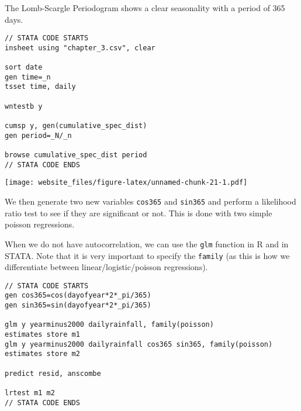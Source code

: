 \documentclass[]{book}
\newenvironment{Shaded}{\begin{snugshade}}{\end{snugshade}}
\newcommand{\KeywordTok}[1]{\textcolor[rgb]{0.13,0.29,0.53}{\textbf{#1}}}
\newcommand{\DataTypeTok}[1]{\textcolor[rgb]{0.13,0.29,0.53}{#1}}
\newcommand{\DecValTok}[1]{\textcolor[rgb]{0.00,0.00,0.81}{#1}}
\newcommand{\StringTok}[1]{\textcolor[rgb]{0.31,0.60,0.02}{#1}}
\newcommand{\CommentTok}[1]{\textcolor[rgb]{0.56,0.35,0.01}{\textit{#1}}}
\newcommand{\OperatorTok}[1]{\textcolor[rgb]{0.81,0.36,0.00}{\textbf{#1}}}
\newcommand{\NormalTok}[1]{#1}
\begin{document}
\newpage

The Lomb-Scargle Periodogram shows a clear seasonality with a period of
365 days.

\begin{verbatim}
// STATA CODE STARTS
insheet using "chapter_3.csv", clear

sort date
gen time=_n
tsset time, daily

wntestb y

cumsp y, gen(cumulative_spec_dist)
gen period=_N/_n

browse cumulative_spec_dist period
// STATA CODE ENDS
\end{verbatim}

\begin{Shaded}
\end{Shaded}

\texttt{[image: website\_files/figure-latex/unnamed-chunk-21-1.pdf]}

\newpage

We then generate two new variables \texttt{cos365} and \texttt{sin365}
and perform a likelihood ratio test to see if they are significant or
not. This is done with two simple poisson regressions.

When we do not have autocorrelation, we can use the \texttt{glm}
function in R and in STATA. Note that it is very important to specify
the \texttt{family} (as this is how we differentiate between
linear/logistic/poisson regressions).

\begin{verbatim}
// STATA CODE STARTS
gen cos365=cos(dayofyear*2*_pi/365)
gen sin365=sin(dayofyear*2*_pi/365)

glm y yearminus2000 dailyrainfall, family(poisson)
estimates store m1
glm y yearminus2000 dailyrainfall cos365 sin365, family(poisson)
estimates store m2

predict resid, anscombe

lrtest m1 m2
// STATA CODE ENDS
\end{verbatim}
\end{document}
